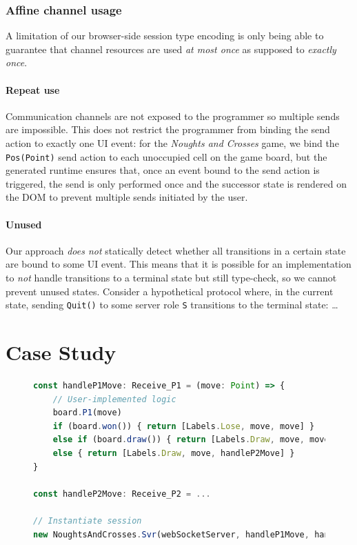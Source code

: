 \documentclass[submission,copyright,creativecommons]{eptcs}
\begin{document}

\subsubsection{Affine channel usage}
A limitation of our browser-side session type encoding is only being able to guarantee that channel resources are used \textit{at most once} as supposed to \textit{exactly once}.

\paragraph{Repeat use} Communication channels are not exposed to the programmer so multiple sends are impossible. This does not restrict the programmer from binding the send action to exactly one UI event: for the \textit{Noughts and Crosses} game, we bind the \texttt{Pos(Point)} send action to each unoccupied cell on the game board, but the generated runtime ensures that, once an event bound to the send action is triggered, the send is only performed once and the successor state is rendered on the DOM to prevent multiple sends initiated by the user.

\paragraph{Unused} Our approach \textit{does not} statically detect whether all transitions in a certain state are bound to some UI event. This means that it is possible for an implementation to \textit{not} handle transitions to a terminal state but still type-check, so we cannot prevent unused states. Consider a hypothetical protocol where, in the current state, sending \texttt{Quit()} to some server role \texttt{S} transitions to the terminal state: \dots

\section{Case Study}
\label{section:example}

\begin{figure}
\begin{lstlisting}[language=JavaScript, tabsize=4, title=\texttt{./app.ts}]
const handleP1Move: Receive_P1 = (move: Point) => {
	// User-implemented logic
	board.P1(move)
	if (board.won()) { return [Labels.Lose, move, move] }
	else if (board.draw()) { return [Labels.Draw, move, move] }
	else { return [Labels.Draw, move, handleP2Move] } 
}

const handleP2Move: Receive_P2 = ...

// Instantiate session
new NoughtsAndCrosses.Svr(webSocketServer, handleP1Move, handleP2Move)
\end{lstlisting}  
\label{lst:svrprotocol}
\end{figure}
\end{document}

